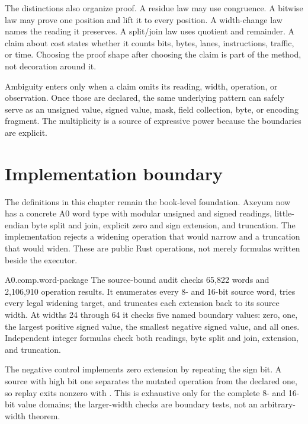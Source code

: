 The distinctions also organize proof. A residue law may use congruence. A
bitwise law may prove one position and lift it to every position. A width-change
law names the reading it preserves. A split/join law uses quotient and
remainder. A claim about cost states whether it counts bits, bytes, lanes,
instructions, traffic, or time. Choosing the proof shape after choosing the
claim is part of the method, not decoration around it.

\begin{keyidea}[title={One pattern can support many meanings without ambiguity}]
Ambiguity enters only when a claim omits its reading, width, operation, or
observation. Once those are declared, the same underlying pattern can safely
serve as an unsigned value, signed value, mask, field collection, byte, or
encoding fragment. The multiplicity is a source of expressive power because
the boundaries are explicit.
\end{keyidea}

\section{Implementation boundary}

The definitions in this chapter remain the book-level foundation. Axeyum now
has a concrete A0 word type with modular unsigned and signed readings,
little-endian byte split and join, explicit zero and sign extension, and
truncation. The implementation rejects a widening operation that would narrow
and a truncation that would widen. These are public Rust operations, not merely
formulas written beside the executor.

\begin{artifact}{A0.comp.word-package}
The source-bound audit checks 65,822 words and 2,106,910 operation results. It
enumerates every 8- and 16-bit source word, tries every legal widening target,
and truncates each extension back to its source width. At widths 24 through 64
it checks five named boundary values: zero, one, the largest positive signed
value, the smallest negative signed value, and all ones. Independent integer
formulas check both readings, byte split and join, extension, and truncation.

The negative control implements zero extension by repeating the sign bit. A
source with high bit one separates the mutated operation from the declared
one, so replay exits nonzero with . This is exhaustive
only for the complete 8- and 16-bit value domains; the larger-width checks are
boundary tests, not an arbitrary-width theorem.
\end{artifact}

